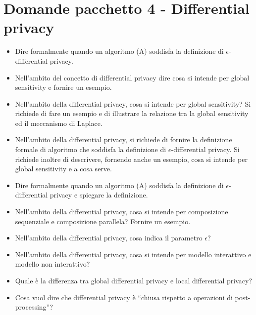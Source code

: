 \documentclass{report}
\begin{document}
\chapter{Domande pacchetto 4 - Differential privacy}
\begin{itemize}
    \item Dire formalmente quando un algoritmo (A) soddisfa la definizione di $\epsilon$-differential privacy.
    \item Nell'ambito del concetto di differential privacy dire cosa si intende per global sensitivity e fornire un esempio.
    \item Nell'ambito della differential privacy, cosa si intende per global sensitivity? Si richiede di fare un esempio e di
illustrare la relazione tra la global sensitivity ed il meccanismo di Laplace.
    \item Nell'ambito della differential privacy, si richiede di fornire la definizione formale di algoritmo che soddisfa la
definizione di $\epsilon$-differential privacy. Si richiede inoltre di descrivere, fornendo anche un esempio, cosa si intende
per global sensitivity e a cosa serve.
    \item Dire formalmente quando un algoritmo (A) soddisfa la definizione di $\epsilon$-differential privacy e spiegare la
definizione.
    \item Nell'ambito della differential privacy, cosa si intende per composizione sequenziale e composizione parallela? Fornire un esempio.
    \item Nell'ambito della differential privacy, cosa indica il parametro $\epsilon$?
    \item Nell'ambito della differential privacy, cosa si intende per modello interattivo e modello non interattivo?
    \item Quale è la differenza tra global differential privacy e local differential privacy?
    \item Cosa vuol dire che differential privacy è “chiusa rispetto a operazioni di post-processing”?
\end{itemize}
\end{document}
